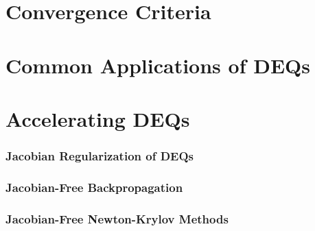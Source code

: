 \section{Convergence Criteria}
\label{sec:ssproblem_convergence_criteria}


\section{Common Applications of DEQs}
\label{sec:common_applications_deqs}

\section{Accelerating DEQs}
\label{sec:accelerating_deqs}

\subsubsection{Jacobian Regularization of DEQs}
\label{subsec:jacobian_regularization_deqs}

\subsubsection{Jacobian-Free Backpropagation}
\label{subsec:jacobian_free_backpropagation}

\subsubsection{Jacobian-Free Newton-Krylov Methods}

